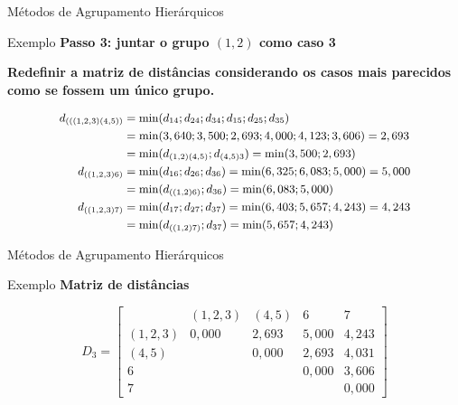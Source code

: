 \documentclass[
  ignorenonframetext,
  aspectratio=169,
]{beamer}
\begin{document}
\begin{frame}{Métodos de Agrupamento Hierárquicos}
\label{muxe9todos-de-agrupamento-hieruxe1rquicos-22}
\begin{block}{Exemplo}
\label{exemplo-11}
\textbf{Passo 3: juntar o grupo \((1,2)\) como caso 3}

\textbf{Redefinir a matriz de distâncias considerando os casos mais
parecidos como se fossem um único grupo.}

\[ \small
\begin{aligned}
d_{(((1,2,3)(4,5))} &=  \min(d_{14};d_{24};d_{34};d_{15};d_{25};d_{35}) \\ &= \min(3,640; 3,500; 2,693; 4,000; 4,123; 3,606) = 2,693 \\ &= 
\min(d_{(1,2)(4,5)};d_{(4,5)3}) = \min(3,500;2,693) \\
d_{((1,2,3)6)} &= \min(d_{16};d_{26};d_{36}) =  \min(6,325; 6,083; 5,000) = 5,000 \\ &=  \min(d_{((1,2)6)};d_{36}) = \min(6,083;5,000) \\
d_{((1,2,3)7)} &= \min(d_{17};d_{27};d_{37}) =  \min(6,403; 5,657; 4,243) = 4,243 \\ &=  \min(d_{((1,2)7)};d_{37}) = \min(5,657;4,243) \\ 
\end{aligned}
\]
\end{block}
\end{frame}

\begin{frame}{Métodos de Agrupamento Hierárquicos}
\label{muxe9todos-de-agrupamento-hieruxe1rquicos-23}
\begin{block}{Exemplo}
\label{exemplo-12}
\textbf{Matriz de distâncias}

\[D_3 = \left[ \begin{matrix}
&(1,2,3) &(4,5)&6&7\\ 
(1,2,3)& 0,000 & 2,693 & 5,000 & 4,243 \\
(4,5)    &  & 0,000 &  2,693 & 4,031 \\
6  &     &  & 0,000 & 3,606 \\
7  &      &  &  & 0,000
                    \end{matrix} \right]\]
\end{block}
\end{frame}
\end{document}
